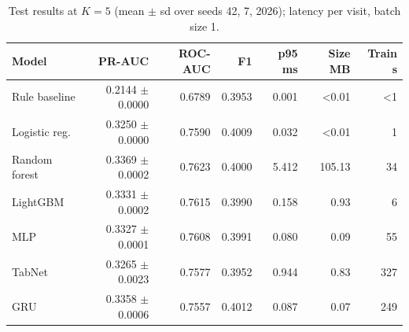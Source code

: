 \begin{table}[t]
\centering
\caption{Test results at $K=5$ (mean $\pm$ sd over seeds 42, 7, 2026); latency per visit, batch size 1.}
\label{tab:main}
\footnotesize
\begin{tabular}{lrrrrrr}
\toprule
Model & PR-AUC & ROC-AUC & F1 & p95 ms & Size MB & Train s \\
\midrule
Rule baseline & 0.2144 $\pm$ 0.0000 & 0.6789 & 0.3953 & 0.001 & <0.01 & <1 \\
Logistic reg. & 0.3250 $\pm$ 0.0000 & 0.7590 & 0.4009 & 0.032 & <0.01 & 1 \\
Random forest & 0.3369 $\pm$ 0.0002 & 0.7623 & 0.4000 & 5.412 & 105.13 & 34 \\
LightGBM & 0.3331 $\pm$ 0.0002 & 0.7615 & 0.3990 & 0.158 & 0.93 & 6 \\
MLP & 0.3327 $\pm$ 0.0001 & 0.7608 & 0.3991 & 0.080 & 0.09 & 55 \\
TabNet & 0.3265 $\pm$ 0.0023 & 0.7577 & 0.3952 & 0.944 & 0.83 & 327 \\
GRU & 0.3358 $\pm$ 0.0006 & 0.7557 & 0.4012 & 0.087 & 0.07 & 249 \\
\bottomrule
\end{tabular}
\end{table}
